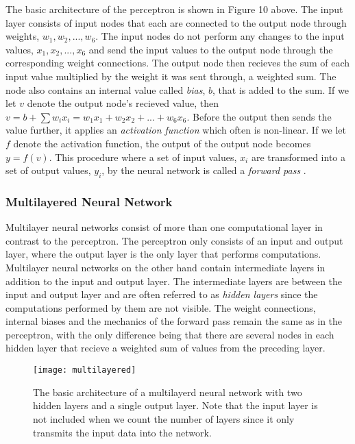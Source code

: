 \documentclass[titlepage]{article}
\begin{document}
\vskip 0.1cm

\noindent
The basic architecture of the perceptron is shown in Figure 10 above. The input layer consists of input nodes that each are connected to the output node through weights, $w_{1}, w_{2}, ..., w_{6}$. The input nodes do not perform any changes to the input values, $x_{1}, x_{2}, ..., x_{6}$ and send the input values to the output node through the corresponding weight connections. The output node then recieves the sum of each input value multiplied by the weight it was sent through, a weighted sum. The node also contains an internal value called \emph{bias}, $b$, that is added to the sum. If we let $v$ denote the output node's recieved value, then $v = b + \sum w_{i} x_{i} = w_{1} x_{1} + w_{2} x_{2} + ... + w_{6} x_{6}$. Before the output then sends the value further, it applies an \emph{activation function} which often is non-linear. If we let $f$ denote the activation function, the output of the output node becomes $y = f(v)$. This procedure where a set of input values, $x_{i}$ are transformed into a set of output values, $y_{i}$, by the neural network is called a \emph{forward pass} \cite{charu}.

\subsubsection{Multilayered Neural Network}

\vskip 0.2cm

Multilayer neural networks consist of more than one computational layer \cite{charu} in contrast to the perceptron. The perceptron only consists of an input and output layer, where the output layer is the only layer that performs computations. Multilayer neural networks on the other hand contain intermediate layers in addition to the input and output layer. The intermediate layers are between the input and output layer and are often referred to as \emph{hidden layers} since the computations performed by them are not visible. The weight connections, internal biases and the mechanics of the forward pass remain the same as in the perceptron, with the only difference being that there are several nodes in each hidden layer that recieve a weighted sum of values from the preceding layer.

\newpage

\begin{figure}[h]
    \centering
    \texttt{[image: multilayered]}
    \vskip 0.2cm
    \caption{The basic architecture of a multilayerd neural network with two hidden layers and a single output layer. Note that the input layer is not included when we count the number of layers since it only transmits the input data into the network. }
\end{figure}
\end{document}
